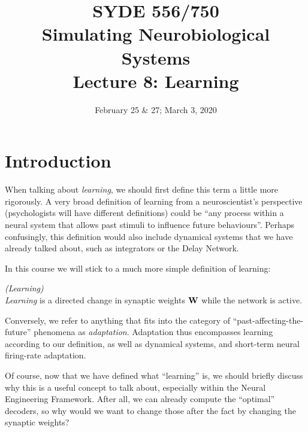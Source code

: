 \documentclass[10pt,letterpaper,oneside]{article}
\date{February 25 \& 27; March 3, 2020}
\title{SYDE 556/750 \\ Simulating Neurobiological Systems \\ Lecture 8: Learning}
\begin{document}

\section{Introduction}


When talking about \emph{learning}, we should first define this term a little more rigorously. A very broad definition of learning from a neuroscientist's perspective (psychologists will have different definitions) could be \enquote{any process within a neural system that allows past stimuli to influence future behaviours}. Perhaps confusingly, this definition would also include dynamical systems that we have already talked about, such as integrators or the Delay Network.

In this course we will stick to a much more simple definition of learning:
\begin{mdframed}
	\hfill\emph{(Learning)}\\
	\emph{Learning} is a directed change in synaptic weights ${\mathbf{W}}$ while the network is active.
\end{mdframed}
Conversely, we refer to anything that fits into the category of \enquote{past-affecting-the-future} phenomena as \emph{adaptation}. Adaptation thus encompasses learning according to our definition, as well as dynamical systems, and short-term neural firing-rate adaptation.

Of course, now that we have defined what \enquote{learning} is, we should briefly discuss why this is a useful concept to talk about, especially within the Neural Engineering Framework. After all, we can already compute the \enquote{optimal} decoders, so why would we want to change those after the fact by changing the synaptic weights?
\end{document}
